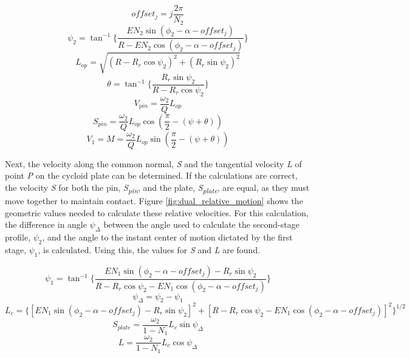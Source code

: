 \begin{equation}\label{eq:offset2}
offset_j = j \frac{2\pi}{N_2}
\end{equation}
\begin{equation}\label{eq:psi2}
\psi_2 = \tan^{-1}\bigg\{\frac{E N_2 \sin(\phi_2-\alpha-offset_j)}{R-E N_2\cos(\phi_2-\alpha-offset_j)}\bigg\}
\end{equation}
\begin{equation} \label{eq:l_op}
L_{op} = \sqrt{(R-R_r\cos\psi_2)^2 + (R_r\sin\psi_2)^2}
\end{equation}
\begin{equation}
\theta = \tan^{-1}\bigg\{\frac{R_r\sin\psi_2}{R-R_r\cos\psi_2}\bigg\}
\end{equation}
\begin{equation}
V_{pin} = \frac{\omega_2}{Q} L_{op}
\end{equation}
\begin{equation} \label{eq:s_pin}
S_{pin} = \frac{\omega_2}{Q} L_{op} \cos(\frac{\pi}{2}-(\psi+\theta))
\end{equation}
\begin{equation}
V_{1} = M = \frac{\omega_2}{Q} L_{op} \sin(\frac{\pi}{2}-(\psi+\theta))
\end{equation}


Next, the velocity along the common normal, \textit{S} and the tangential velocity \textit{L} of point \textit{P} on the cycloid plate can be determined. If the calculations are correct, the velocity \textit{S} for both the pin, \textit{S\textsubscript{pin}}, and the plate, \textit{S\textsubscript{plate}}, are equal, as they must move together to maintain contact. Figure \ref{fig:dual_relative_motion} shows the geometric values needed to calculate these relative velocities. For this calculation, the difference in angle $\psi_\Delta$ between the angle used to calculate the second-stage profile, $\psi_2$, and the angle to the instant center of motion dictated by the first stage, $\psi_1$, is calculated. Using this, the values for \textit{S} and \textit{L} are found. 

\begin{equation}\label{eq:psi_1}
\psi_1 = \tan^{-1}\bigg\{\frac{E N_1 \sin(\phi_2-\alpha-offset_j) - R_r\sin\psi_2}
{R-R_r\cos\psi_2 - E N_1\cos(\phi_2-\alpha-offset_j)}\bigg\}
\end{equation}
\begin{equation} \label{eq:psi_delta}
\psi_{\Delta} = \psi_2 - \psi_1
\end{equation}
\begin{dmath}\label{eq:L_c}
L_{c} = \bigg\{\left[E N_1 \sin(\phi_2-\alpha-offset_j) - R_r\sin\psi_2\right]^2 +
\left[R-R_r\cos\psi_2 - E N_1 \cos(\phi_2-\alpha-offset_j)\right]^{2}\bigg\}^{1/2}
\end{dmath}
\begin{equation}\label{eq:s_plate}
S_{plate} = \frac{\omega_2}{1-N_1} L_c \sin\psi_{\Delta}
\end{equation}
\begin{equation}\label{eq:L}
L = \frac{\omega_2}{1-N_1} L_c \cos\psi_{\Delta}
\end{equation}

